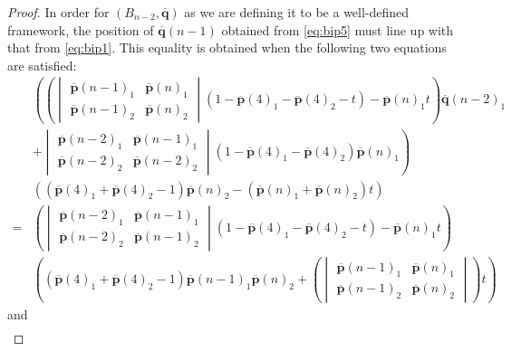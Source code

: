 \documentclass[10pt,a4paper]{amsart}
\begin{document}
\begin{proof}
    In order for $(B_{n-2},\overline{\mathbf{q}})$ as we are defining it to be a well-defined framework, the position of $\overline{\mathbf{q}}(n-1)$ obtained from \cref{eq:bip5} must line up with that from \cref{eq:bip1}.
    This equality is obtained when the following two equations are satisfied:
    \begin{equation}\label{eq:bip6}
    \begin{split}
        &\left(\left( \begin{vmatrix} \overline{\mathbf{p}}(n-1)_1 & \overline{\mathbf{p}}(n)_1 \\ \overline{\mathbf{p}}(n-1)_2 & \overline{\mathbf{p}}(n)_2 \end{vmatrix} (1-\overline{\mathbf{p}}(4)_1 - \overline{\mathbf{p}}(4)_2 -t) - \overline{\mathbf{p}}(n)_1t \right)\overline{\mathbf{q}}(n-2)_1\right.\\
        &+\left. \begin{vmatrix} \overline{\mathbf{p}}(n-2)_1 & \overline{\mathbf{p}}(n-1)_1 \\ \overline{\mathbf{p}}(n-2)_2 & \overline{\mathbf{p}}(n-2)_2 \end{vmatrix} (1-\overline{\mathbf{p}}(4)_1-\overline{\mathbf{p}}(4)_2)\overline{\mathbf{p}}(n)_1 \right) \\
        &((\overline{\mathbf{p}}(4)_1+\overline{\mathbf{p}}(4)_2 - 1)\overline{\mathbf{p}}(n)_2 - (\overline{\mathbf{p}}(n)_1+\overline{\mathbf{p}}(n)_2)t) \\
        =& \left( \begin{vmatrix} \overline{\mathbf{p}}(n-2)_1 & \overline{\mathbf{p}}(n-1)_1 \\ \overline{\mathbf{p}}(n-2)_2 & \overline{\mathbf{p}}(n-1)_2 \end{vmatrix} (1-\overline{\mathbf{p}}(4)_1-\overline{\mathbf{p}}(4)_2-t) - \overline{\mathbf{p}}(n)_1t \right) \\
        &\left( (\overline{\mathbf{p}}(4)_1+\overline{\mathbf{p}}(4)_2-1)\overline{\mathbf{p}}(n-1)_1\overline{\mathbf{p}}(n)_2 + \left(\begin{vmatrix} \overline{\mathbf{p}}(n-1)_1 & \overline{\mathbf{p}}(n)_1 \\ \overline{\mathbf{p}}(n-1)_2 & \overline{\mathbf{p}}(n)_2 \end{vmatrix}\right)t \right)
    \end{split}
    \end{equation}
    and
    \begin{equation}\label{eq:bip7}
    \begin{split}

\end{split}
\end{equation}
\end{proof}
\end{document}
